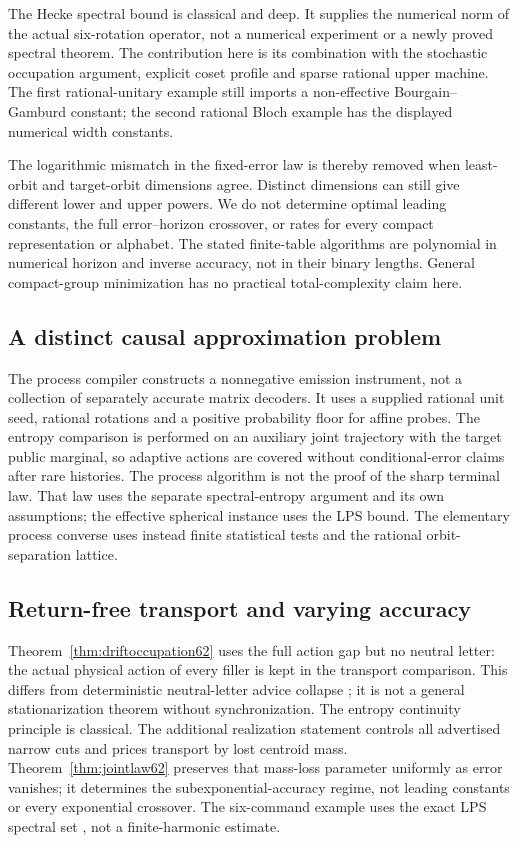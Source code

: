 The Hecke spectral bound \cite{LPS61,PLP61pre} is classical and deep.
It supplies the numerical norm of the actual six-rotation operator,
not a numerical experiment or a newly proved spectral theorem.
The contribution here is its combination with the stochastic
occupation argument, explicit coset profile and sparse rational upper
machine. The first rational-unitary example still imports a
non-effective Bourgain--Gamburd constant; the second rational Bloch
example has the displayed numerical width constants.

The logarithmic mismatch in the fixed-error law is thereby removed
when least-orbit and target-orbit dimensions agree. Distinct dimensions
can still give different lower and upper powers. We do not determine
optimal leading constants, the full error--horizon crossover, or rates
for every compact representation or alphabet. The stated finite-table
algorithms are polynomial in numerical horizon and inverse accuracy,
not in their binary lengths. General compact-group minimization has no
practical total-complexity claim here.

\subsection{A distinct causal approximation problem}
The process compiler constructs a nonnegative emission instrument, not
a collection of separately accurate matrix decoders. It uses a supplied
rational unit seed, rational rotations and a positive probability floor
for affine probes. The entropy comparison is performed on an auxiliary
joint trajectory with the target public marginal, so adaptive actions
are covered without conditional-error claims after rare histories.
The process algorithm is not the proof of the sharp terminal law.
That law uses the separate spectral-entropy argument and its own
assumptions; the effective spherical instance uses the LPS bound. The elementary process converse uses instead
finite statistical tests and the rational orbit-separation lattice.

\subsection{Return-free transport and varying accuracy}
Theorem~\ref{thm:driftoccupation62} uses the full action gap but no
neutral letter: the actual physical action of every filler is kept in
the transport comparison. This differs from deterministic neutral-letter
advice collapse \cite[Theorem~10]{FP}; it is not a general
stationarization theorem without synchronization. The entropy continuity
principle \cite[Proposition~1]{PW61} is classical. The additional
realization statement controls all advertised narrow cuts and prices
transport by lost centroid mass. Theorem~\ref{thm:jointlaw62} preserves
that mass-loss parameter uniformly as error vanishes; it determines the
subexponential-accuracy regime, not leading constants or every
exponential crossover. The six-command example uses the exact LPS
spectral set \cite[Theorem~1.1]{PLP61pre}, not a finite-harmonic estimate.
